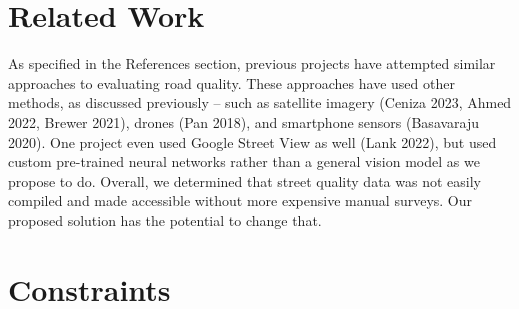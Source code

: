 \documentclass{article}
\begin{document}
\begin{appendices}
\section{ Related Work }
As specified in the References section, previous projects have attempted similar approaches to evaluating road quality. These approaches have used other methods, as discussed previously – such as satellite imagery (Ceniza 2023, Ahmed 2022, Brewer 2021), drones (Pan 2018), and smartphone sensors (Basavaraju 2020). One project even used Google Street View as well (Lank 2022), but used custom pre-trained neural networks rather than a general vision model as we propose to do. Overall, we determined that street quality data was not easily compiled and made accessible without more expensive manual surveys. Our proposed solution has the potential to change that.

\section{ Constraints }


\end{appendices}
\end{document}
